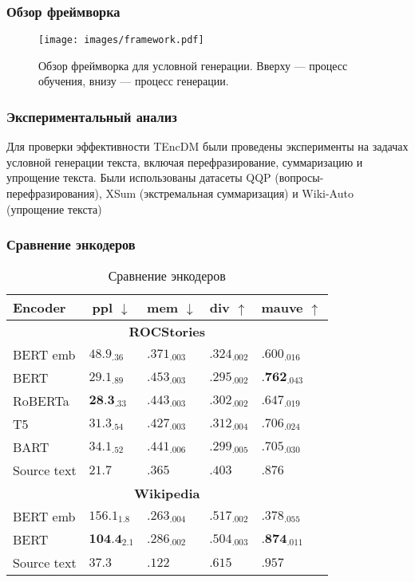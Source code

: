 \documentclass{beamer}
\begin{document}
\begin{frame}
\frametitle{Обзор фреймворка}
\begin{figure}
\centering
\texttt{[image: images/framework.pdf]}
\caption{Обзор фреймворка для условной генерации. Вверху — процесс обучения, внизу — процесс генерации.}
\end{figure}
\end{frame}

\begin{frame}
\frametitle{Экспериментальный анализ}
Для проверки эффективности TEncDM были проведены эксперименты на задачах условной генерации текста, включая перефразирование, суммаризацию и упрощение текста. Были использованы датасеты QQP \cite{qqp} (вопросы-перефразирования), XSum \cite{xsum} (экстремальная суммаризация) и Wiki-Auto \cite{wiki_auto} (упрощение текста)
\end{frame}

\begin{frame}
\frametitle{Сравнение энкодеров}
\begin{table}
\centering
\begin{tabular}{l|llll}
\hline
\multicolumn{1}{l|}{\textbf{Encoder}}
    & \multicolumn{1}{c}{\textbf{ppl} $\downarrow$} 
    & \multicolumn{1}{c}{\textbf{mem} $\downarrow$}
    & \multicolumn{1}{c}{\textbf{div} $\uparrow$}
    & \multicolumn{1}{c}{\textbf{mauve} $\uparrow$}\\
\hline
\multicolumn{5}{c}{\textbf{ROCStories}} \\
\hline
BERT emb & $48.9_{.36}$ & $.371_{.003}$ & $.324_{.002}$ & $.600_{.016}$ \\
BERT & $29.1_{.89}$ & ${.453}_{.003}$ & ${.295}_{.002}$ & $\textbf{.762}_{.043}$ \\
RoBERTa & $\textbf{28.3}_{.33}$ & ${.443}_{.003}$ & ${.302}_{.002}$ & ${.647}_{.019}$\\
T5 & ${31.3}_{.54}$ & $.427_{.003}$ & $.312_{.004}$ & $.706_{.024}$ \\
BART & $34.1_{.52}$ & $.441_{.006}$ & $.299_{.005}$ & $.705_{.030}$\\
\hline
Source text & $21.7$ & $.365$ & $.403$ & $.876$ \\
\hline
\multicolumn{5}{c}{\textbf{Wikipedia}} \\
\hline
BERT emb & $156.1_{1.8}$ & $.263_{.004}$ & $.517_{.002}$ & $.378_{.055}$ \\
BERT & $\textbf{104.4}_{2.1}$ & $.286_{.002}$ & $.504_{.003}$ & $\textbf{.874}_{.011}$ \\
\hline
Source text & $37.3$ & $.122$ & $.615$ & $.957$ \\
\hline
\end{tabular}
\caption{Сравнение энкодеров}
\label{tab::encoders}
\end{table}
\end{frame}
\end{document}
